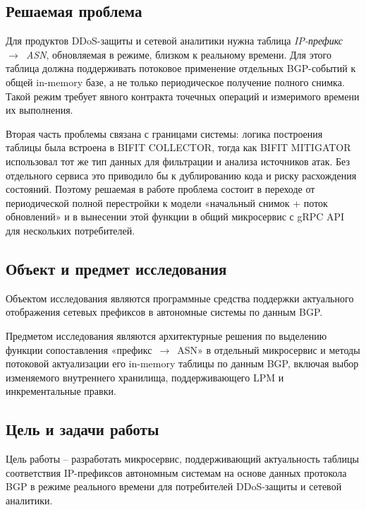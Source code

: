 \subsection*{Решаемая проблема}

Для продуктов DDoS-защиты и сетевой аналитики нужна таблица
\textit{IP-префикс~$\rightarrow$~ASN}, обновляемая в режиме, близком к
реальному времени. Для этого таблица должна поддерживать потоковое
применение отдельных BGP-событий к общей in-memory базе, а не только
периодическое получение полного снимка. Такой режим требует явного
контракта точечных операций и измеримого времени их выполнения.

Вторая часть проблемы связана с границами системы: логика построения
таблицы была встроена в BIFIT COLLECTOR, тогда как BIFIT MITIGATOR
использовал тот же тип данных для фильтрации и анализа источников атак.
Без отдельного сервиса это приводило бы к дублированию кода и риску
расхождения состояний. Поэтому решаемая в работе проблема состоит в
переходе от периодической полной перестройки к модели «начальный снимок
+ поток обновлений» и в вынесении этой функции в общий микросервис с
gRPC API для нескольких потребителей.

\subsection*{Объект и предмет исследования}

Объектом исследования являются программные средства поддержки
актуального отображения сетевых префиксов в автономные системы по
данным BGP.

Предметом исследования являются архитектурные решения по выделению
функции сопоставления «префикс~$\rightarrow$~ASN» в отдельный
микросервис и методы потоковой актуализации его in-memory таблицы по
данным BGP, включая выбор изменяемого внутреннего хранилища,
поддерживающего LPM и инкрементальные правки.

\subsection*{Цель и задачи работы}

Цель работы -- разработать микросервис, поддерживающий актуальность таблицы
соответствия IP-префиксов автономным системам на основе данных протокола
BGP в режиме реального времени для потребителей DDoS-защиты и сетевой
аналитики.

